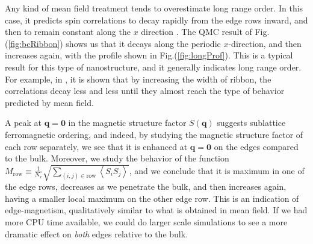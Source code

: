 Any kind of mean field treatment tends to overestimate long range order.
In this case, it predicts spin correlations to decay rapidly from the edge rows inward, and then to remain constant along the $x$ direction \cite{feldner_dynamical_2011}.
The \ac{QMC} result of Fig.(\ref{fig:bcRibbon}) shows us that it decays along the periodic $x$-direction, and then increases again, with the profile shown in Fig.(\ref{fig:longProf}).
This is a typical result for this type of nanostructure, and it generally indicates long range order.
For example, in \cite{feldner_dynamical_2011}, it is shown that by increasing the width of ribbon, the correlations decay less and less until they almost reach the type of behavior predicted by mean field.

A peak at $\bm q = \bm 0$ in the magnetic structure factor $S ( \bm q )$ suggests sublattice ferromagnetic ordering, and indeed, by studying the magnetic structure factor of each row separately, we see that it is enhanced at $\bm q = \bm 0$ on the edges compared to the bulk.
Moreover, we study the behavior of the function $M_{\text{row}} \equiv \frac{1}{N_x}\sqrt{ \sum_{(i, j) \in \text{row}} \left\langle S_i S_j \right\rangle}$, and we conclude that it is maximum in one of the edge rows, decreases as we penetrate the bulk, and then increases again, having a smaller local maximum on the other edge row.
This is an indication of edge-magnetism, qualitatively similar to what is obtained in mean field.
If we had more CPU time available, we could do larger scale simulations to see a more dramatic effect on \emph{both} edges relative to the bulk.

